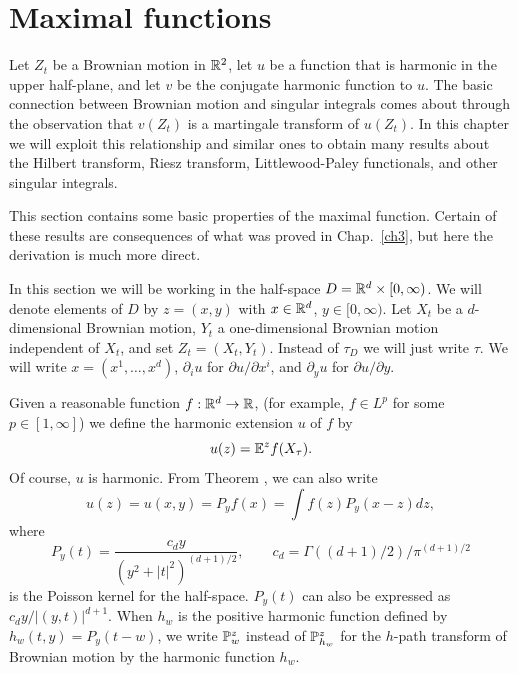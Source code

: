 \label{ch4}

\section{Maximal functions}\label{ch4_sec1}


Let $Z_t$ be a Brownian motion in $\R^2$, let $u$ be a function that is harmonic in the upper half-plane, and let $v$ be the conjugate harmonic function to $u$. The basic connection between Brownian motion and singular integrals comes about through the observation that $v(Z_t)$ is a martingale transform of $u(Z_t)$. In this chapter we will exploit this relationship and similar ones to obtain many results about the Hilbert transform, Riesz transform, Littlewood-Paley functionals, and other singular integrals.

This section contains some basic properties of the maximal function. Certain of these results are consequences of what was proved in Chap.\ \ref{ch3}, but here the derivation is much more direct.

In this section we will be working in the half-space $D = \R^d \times [0,\infty)$. We will denote elements of $D$ by $z = (x,y)$ with $x \in \R^d$, $y \in [0,\infty)$. Let $X_t$ be a $d$-dimensional Brownian motion, $Y_t$ a one-dimensional Brownian motion independent of $X_t$, and set $Z_t = (X_t,Y_t)$. Instead of $\tau_D$ we will just write $\tau$. We will write $x = (x^1,\ldots,x^d)$, $\partial_i u$ for $\partial u/\partial x^i$, and $\partial_y u$ for $\partial u/\partial y$.

Given a reasonable function $f : \R^d \to \R$, (for example, $f \in L^p$ for some $p \in [1,\infty]$) we define the harmonic extension $u$ of $f$ by
\[
    u(z) = \E^z f(X_\tau).
\]
Of course, $u$ is harmonic. From Theorem , we can also write
\mpagebreak
\[
    u(z) = u(x,y) = P_y f(x) = \int f(z)P_y(x-z)dz,
\]
where
\begin{equation}\label{eq:ch4_1.1}
    P_y(t) = \frac{c_d y}{(y^2 + |t|^2)^{(d+1)/2}}, \qquad c_d = \Gamma((d+1)/2)/\pi^{(d+1)/2}
\end{equation}
is the Poisson kernel for the half-space. $P_y(t)$ can also be expressed as $c_d y/|{(y,t)}|^{d+1}$. When $h_w$ is the positive harmonic function defined by $h_w(t,y) = P_y(t-w)$, we write $\P_w^z$ instead of $\P_{h_w}^z$ for the $h$-path transform of Brownian motion by the harmonic function $h_w$.

